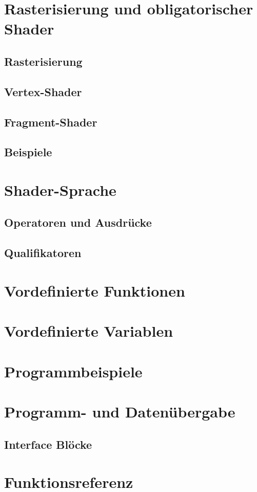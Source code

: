 \section{Rasterisierung und obligatorischer Shader}
\subsection{Rasterisierung}
\subsection{Vertex-Shader}
\subsection{Fragment-Shader}

\subsection{Beispiele}

\section{Shader-Sprache}
\subsection{Operatoren und Ausdrücke}
\subsection{Qualifikatoren}

\section{Vordefinierte Funktionen}

\section{Vordefinierte Variablen}

\section{Programmbeispiele}

\section{Programm- und Datenübergabe}
\subsection{Interface Blöcke}

\section{Funktionsreferenz}








